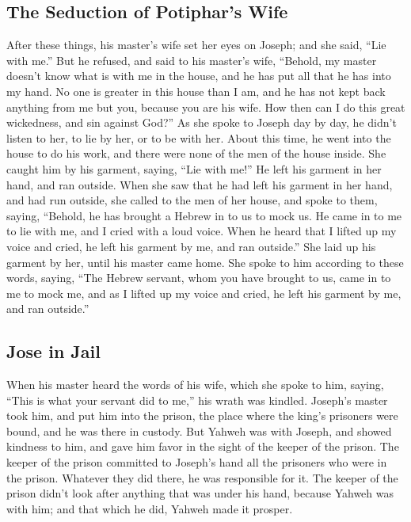 \hypertarget{the-seduction-of-potiphars-wife}{%
\subsection{The Seduction of Potiphar's
Wife}\label{the-seduction-of-potiphars-wife}}

 After these things, his master's wife set her eyes on
Joseph; and she said, ``Lie with me.''  But he refused,
and said to his master's wife, ``Behold, my master doesn't know what is
with me in the house, and he has put all that he has into my hand.
 No one is greater in this house than I am, and he has not
kept back anything from me but you, because you are his wife. How then
can I do this great wickedness, and sin against God?'' 
As she spoke to Joseph day by day, he didn't listen to her, to lie by
her, or to be with her.  About this time, he went into
the house to do his work, and there were none of the men of the house
inside.  She caught him by his garment, saying, ``Lie
with me!'' He left his garment in her hand, and ran outside.
 When she saw that he had left his garment in her hand,
and had run outside,  she called to the men of her house,
and spoke to them, saying, ``Behold, he has brought a Hebrew in to us to
mock us. He came in to me to lie with me, and I cried with a loud voice.
 When he heard that I lifted up my voice and cried, he
left his garment by me, and ran outside.''  She laid up
his garment by her, until his master came home.  She
spoke to him according to these words, saying, ``The Hebrew servant,
whom you have brought to us, came in to me to mock me, 
and as I lifted up my voice and cried, he left his garment by me, and
ran outside.''

\hypertarget{jose-in-jail}{%
\subsection{Jose in Jail}\label{jose-in-jail}}

 When his master heard the words of his wife, which she
spoke to him, saying, ``This is what your servant did to me,'' his wrath
was kindled.  Joseph's master took him, and put him into
the prison, the place where the king's prisoners were bound, and he was
there in custody.  But Yahweh was with Joseph, and showed
kindness to him, and gave him favor in the sight of the keeper of the
prison.  The keeper of the prison committed to Joseph's
hand all the prisoners who were in the prison. Whatever they did there,
he was responsible for it.  The keeper of the prison
didn't look after anything that was under his hand, because Yahweh was
with him; and that which he did, Yahweh made it prosper.

